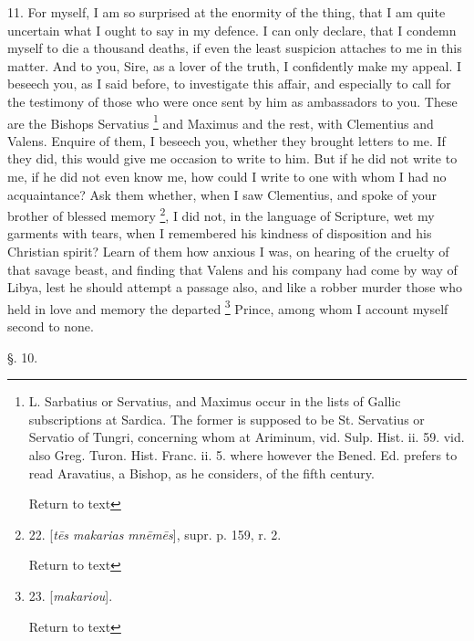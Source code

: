 11. For myself, I am so surprised at the enormity of the thing, that I
am quite uncertain what I ought to say in my defence. I can only
declare, that I condemn myself to die a thousand deaths, if even the
least suspicion attaches to me in this matter. And to you, Sire, as a
lover of the truth, I confidently make my appeal. I beseech you, as I
said before, to investigate this affair, and especially to call for
the testimony of those who were once sent by him as ambassadors to
you. These are the Bishops Servatius \footnote{L. Sarbatius or Servatius, and Maximus occur in the lists of Gallic
subscriptions at Sardica. The former is supposed to be St. Servatius
or Servatio of Tungri, concerning whom at Ariminum, vid. Sulp. Hist.
ii. 59. vid. also Greg. Turon. Hist. Franc. ii. 5. where however the
Bened. Ed. prefers to read Aravatius, a Bishop, as he considers, of
the fifth century.

Return to text} and Maximus and the rest, with Clementius and Valens. Enquire
of them, I beseech you, whether they brought letters to me. If they
did, this would give me occasion to write to him. But if he did not
write to me, if he did not even know me, how could I write to one with
whom I had no acquaintance? Ask them whether, when I saw Clementius,
and spoke of your brother of blessed memory \footnote{22. [\emph{t\={e}s
makarias mn\={e}m\={e}s}],
supr. p. 159, r. 2.

Return to text}, I did not, in the language of Scripture, wet my garments with
tears, when I remembered his kindness of disposition and his Christian
spirit? Learn of them how anxious I was, on hearing of the cruelty of
that savage beast, and finding that Valens and his company had come by
way of Libya, lest he should attempt a passage also, and like a robber
murder those who held in love and memory the departed \footnote{23. [\emph{makariou}].

Return to text} Prince, among whom I account myself second to none.

§. 10.

